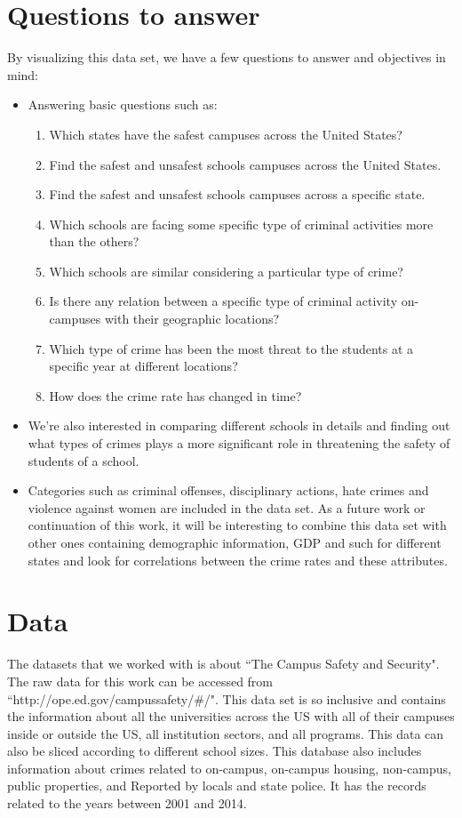 \documentclass[12pt]{article}
\begin{document}
\section{Questions to answer}
By visualizing this data set, we have a few questions to answer and objectives in mind:
\begin{itemize}
\item Answering basic questions such as: 
\begin{enumerate}
\item Which states have the safest campuses across the United States? 
\item Find the safest and unsafest schools campuses across the United States.
\item Find the safest and unsafest schools campuses across a specific state.
\item Which schools are facing some specific type of criminal activities more than the others? 
\item Which schools are similar considering a particular type of crime?   
\item Is there any relation between a specific type of criminal activity on-campuses with their geographic locations?
\item Which type of crime has been the most threat to the students at a specific year at different locations?
\item How does the crime rate has changed in time?


\end{enumerate}
\item We're also interested in comparing different schools in details and finding out what types of crimes plays a more significant role in threatening the safety of students of a school.
\item Categories such as criminal offenses, disciplinary actions,  hate crimes and violence against women are included in the data set. As a future work or continuation of this work, it will be interesting to combine this data set with other ones containing demographic information, GDP and such for different states and look for correlations between the crime rates and these attributes. 

\end{itemize}

\section{Data}
The datasets that we worked with is about ``The Campus Safety and Security". The raw data for this work can be accessed from ``http://ope.ed.gov/campussafety/\#/". This data set is so inclusive and contains the information about all the universities across the US with all of their campuses inside or outside the US, all institution sectors, and all programs.  This data can also be sliced according to different school sizes. This database also includes information about crimes related to on-campus, on-campus housing, non-campus, public properties, and Reported by locals and state police. It has the records related to the years between 2001 and 2014.
\end{document}
